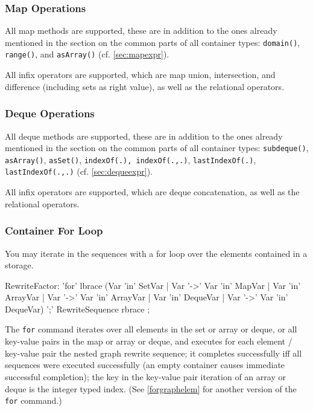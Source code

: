 \subsubsection*{Map Operations}
All map methods are supported, these are in addition to the ones already mentioned in the section on the common parts of all container types: \texttt{domain()}, \texttt{range()}, and \texttt{asArray()} (cf. \ref{sec:mapexpr}).

All infix operators are supported, which are map union, intersection, and difference (including sets as right value), as well as the relational operators.

\subsubsection*{Deque Operations}
All deque methods are supported, these are in addition to the ones already mentioned in the section on the common parts of all container types: \texttt{subdeque()}, \texttt{asArray()}, \texttt{asSet()}, \texttt{indexOf(.), \texttt{indexOf(.,.)}}, \texttt{lastIndexOf(.)}, \texttt{lastIndexOf(.,.)} (cf. \ref{sec:dequeexpr}).

All infix operators are supported, which are deque concatenation, as well as the relational operators.

\subsubsection*{Container For Loop}

You may iterate in the sequences with a for loop over the elements contained in a storage.

\begin{rail}
  RewriteFactor:
    'for' lbrace (Var 'in' SetVar | Var '->' Var 'in' MapVar | Var 'in' ArrayVar | Var '->' Var 'in' ArrayVar | Var 'in' DequeVar | Var '->' Var 'in' DequeVar) ';' RewriteSequence rbrace
    ;
\end{rail}\label{forstorage}

The \texttt{for} command iterates over all elements in the set or array or deque, or all key-value pairs in the map or array or deque, and executes for each element / key-value pair the nested graph rewrite sequence; it completes successfully iff all sequences were executed successfully (an empty container causes immediate successful completion); the key in the key-value pair iteration of an array or deque is the integer typed index. (See \ref{forgraphelem} for another version of the \texttt{for} command.)

